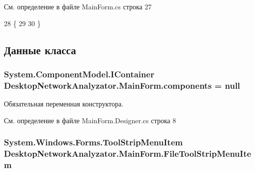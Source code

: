 См. определение в файле Main\+Form.\+cs строка 27


\begin{DoxyCode}
28         \{
29 
30         \}
\end{DoxyCode}


\subsection{Данные класса}
\subsubsection[{\texorpdfstring{components}{components}}]{\setlength{\rightskip}{0pt plus 5cm}System.\+Component\+Model.\+I\+Container Desktop\+Network\+Analyzator.\+Main\+Form.\+components = null\hspace{0.3cm}{\ttfamily [private]}}\hypertarget{class_desktop_network_analyzator_1_1_main_form_a89743a76f0c4531de267fc2213deea8a}{}\label{class_desktop_network_analyzator_1_1_main_form_a89743a76f0c4531de267fc2213deea8a}


Обязательная переменная конструктора. 



См. определение в файле Main\+Form.\+Designer.\+cs строка 8

\subsubsection[{\texorpdfstring{File\+Tool\+Strip\+Menu\+Item}{FileToolStripMenuItem}}]{\setlength{\rightskip}{0pt plus 5cm}System.\+Windows.\+Forms.\+Tool\+Strip\+Menu\+Item Desktop\+Network\+Analyzator.\+Main\+Form.\+File\+Tool\+Strip\+Menu\+Item\hspace{0.3cm}{\ttfamily [private]}}\hypertarget{class_desktop_network_analyzator_1_1_main_form_a605ff2f6848e2a4bed83d629b92c8de2}{}\label{class_desktop_network_analyzator_1_1_main_form_a605ff2f6848e2a4bed83d629b92c8de2}



